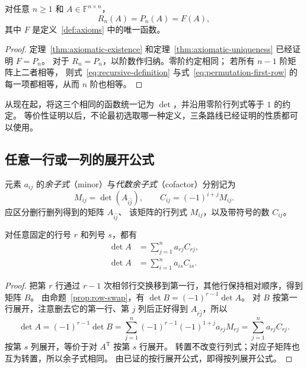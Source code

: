 \documentclass[UTF8,12pt,a4paper,fontset=fandol]{ctexart}
\begin{document}
\begin{corollary}[三种代数定义一致]
\label{cor:equivalent-definitions}
对任意 $n\geq1$ 和 $A\in\mathbb F^{n\times n}$，
\[
  R_n(A)=P_n(A)=F(A),
\]
其中 $F$ 是定义~\ref{def:axioms} 中的唯一函数。
\end{corollary}

\begin{proof}
定理~\ref{thm:axiomatic-existence} 和定理~\ref{thm:axiomatic-uniqueness}
已经证明 $F=P_n$。
对于 $R_n=P_n$，以阶数作归纳。零阶约定相同；
若所有 $n-1$ 阶矩阵上二者相等，
则式~\eqref{eq:recursive-definition} 与式~\eqref{eq:permutation-first-row}
的每一项都相等，从而 $n$ 阶也相等。
\end{proof}

从现在起，将这三个相同的函数统一记为 $\det$，并沿用零阶行列式等于 $1$ 的约定。
等价性证明以后，不论最初选取哪一种定义，三条路线已经证明的性质都可以使用。

\subsection{任意一行或一列的展开公式}

元素 $a_{ij}$ 的\emph{余子式}（minor）与\emph{代数余子式}（cofactor）分别记为
\[
  M_{ij}=\det(A_{\widehat i\widehat j}),\qquad
  C_{ij}=(-1)^{i+j}M_{ij}.
\]
应区分删行删列得到的矩阵 $A_{\widehat i\widehat j}$、
该矩阵的行列式 $M_{ij}$，以及带符号的数 $C_{ij}$。

\begin{theorem}[按任意行或列展开]
\label{thm:cofactor-expansion}
对任意固定的行号 $r$ 和列号 $s$，都有
\begin{align}
  \det A&=\sum_{j=1}^{n}a_{rj}C_{rj},
  \label{eq:arbitrary-row-expansion}\\
  \det A&=\sum_{i=1}^{n}a_{is}C_{is}.
  \label{eq:arbitrary-column-expansion}
\end{align}
\end{theorem}

\begin{proof}
把第 $r$ 行通过 $r-1$ 次相邻行交换移到第一行，其他行保持相对顺序，得到矩阵 $B$。
由命题~\ref{prop:row-swap}，有 $\det B=(-1)^{r-1}\det A$。
对 $B$ 按第一行展开，注意删去它的第一行、第 $j$ 列后正好得到
$A_{\widehat r\widehat j}$，所以
\[
  \det A
  =(-1)^{r-1}\det B
  =\sum_{j=1}^{n}(-1)^{r-1}(-1)^{1+j}a_{rj}M_{rj}
  =\sum_{j=1}^{n}a_{rj}C_{rj}.
\]
按第 $s$ 列展开，等价于对 $A^{\mathsf T}$ 按第 $s$ 行展开。
转置不改变行列式；对应子矩阵也互为转置，所以余子式相同。
由已证的按行展开公式，即得按列展开公式。
\end{proof}
\end{document}
